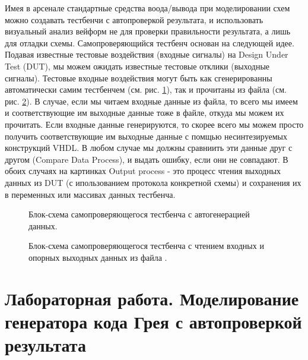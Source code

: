 Имея в арсенале стандартные средства воода/вывода при моделировании схем можно создавать тестбенчи с автопроверкой результата, и использовать визуальный анализ вейформ не для проверки правильности результата, а лишь для отладки схемы. Самопроверяющийся тестбенч основан на следующей идее. Подавая известные тестовые воздействия (входные сигналы) на Design Under Test (DUT), мы можем ожидать известные тестовые отклики (выходные сигналы). Тестовые входные воздействия могут быть как сгенерированны автоматически самим тестбенчем (см. рис. \ref{tb_1}), так и прочитаны из файла (см. рис. \ref{tb_2}). В случае, если мы читаем входные данные из файла, то всего мы имеем и соответствующие им выходные данные тоже в файле, откуда мы можем их прочитать. Если входные данные генерируются, то скорее всего мы можем просто получить соответствующие им выходные данные с помщью несинтезируемых конструкций VHDL. В любом случае мы должны сравниить эти данные друг с другом (Compare Data Process), и выдать ошибку, если они не совпадают. В обоих случаях на картинках Output process - это процесс чтения выходных данных из DUT (с ипользованием протокола конкретной схемы) и сохранения их в переменных или массивах данных тестбенча. 

\begin{figure}[ht]
\centering
{}
\caption{Блок-схема самопроверяющегося тестбенча с автогенерацией данных.}
\label{tb_1}
\end{figure}


\begin{figure}[ht]
\centering
{}
\caption{Блок-схема самопроверяющегося тестбенча с чтением входных и опорных выходных данных из файла .}
\label{tb_2}
\end{figure}


\section{Лабораторная работа. Моделирование генератора кода Грея с автопроверкой результата}


